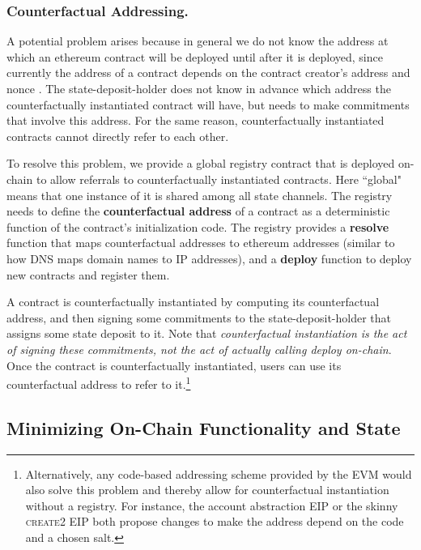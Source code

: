 \documentclass[prb,floatfix,reprint,nofootinbib,amsmath,amssymb,epsfig,pre,floats,letterpaper,groupedaffiliation,tightenlines,allcolors=blue,11pt]{revtex4}
\theoremstyle{definition}
\theoremstyle{definition}
\theoremstyle{definition}
\begin{document}
\subsubsection{Counterfactual Addressing.}
\label{section:counterfactualaddressing}

A potential problem arises because in general we do not know the address at which an ethereum contract will be deployed until after it is deployed, since currently the address of a contract depends on the contract creator's address and nonce \cite{se:contractaddress}. The state-deposit-holder does not know in advance which address the counterfactually instantiated contract will have, but needs to make commitments that involve this address. For the same reason, counterfactually instantiated contracts cannot directly refer to each other.

To resolve this problem, we provide a global registry contract that is deployed on-chain to allow referrals to counterfactually instantiated contracts. Here ``global" means that one instance of it is shared among all state channels. The registry needs to define the \textbf{counterfactual address} of a contract as a deterministic function of the contract's initialization code. The registry provides a \textbf{resolve} function that maps counterfactual addresses to ethereum addresses (similar to how DNS maps domain names to IP addresses), and a \textbf{deploy} function to deploy new contracts and register them.

A contract is counterfactually instantiated by computing its counterfactual address, and then signing some commitments to the state-deposit-holder that assigns some state deposit to it. Note that \textit{counterfactual instantiation is the act of signing these commitments, not the act of actually calling deploy on-chain}. Once the contract is counterfactually instantiated, users can use its counterfactual address to refer to it.\footnote{Alternatively, any code-based addressing scheme provided by the EVM would also solve this problem and thereby allow for counterfactual instantiation without a registry. For instance, the account abstraction EIP \cite{eip:accountabstraction} or the skinny \textsc{create2} EIP both propose changes to make the address depend on the code and a chosen salt.}

\subsection{Minimizing On-Chain Functionality and State}
\end{document}
